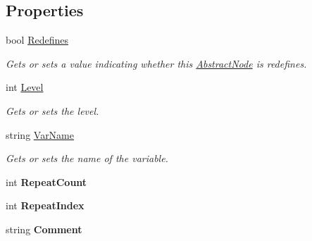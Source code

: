 \subsection*{Properties}
\begin{DoxyCompactItemize}
\item 
bool \hyperlink{class__1920_parser_1_1_abstract_node_a66fd8845fa232c78f396f15467e17458}{Redefines}
\begin{DoxyCompactList}\small\item\em Gets or sets a value indicating whether this \hyperlink{class__1920_parser_1_1_abstract_node}{Abstract\+Node} is redefines. \end{DoxyCompactList}\item 
int \hyperlink{class__1920_parser_1_1_abstract_node_a08c3c1dccbd57a5ddf4c6f2144223dc6}{Level}
\begin{DoxyCompactList}\small\item\em Gets or sets the level. \end{DoxyCompactList}\item 
string \hyperlink{class__1920_parser_1_1_abstract_node_ae4a8076d5cf940c9fa0b1a7fecdd4a6a}{Var\+Name}
\begin{DoxyCompactList}\small\item\em Gets or sets the name of the variable. \end{DoxyCompactList}\item 
int {\bfseries Repeat\+Count}\hypertarget{class__1920_parser_1_1_abstract_node_a68d196e888509c7a603ea9f89124cd11}{}\label{class__1920_parser_1_1_abstract_node_a68d196e888509c7a603ea9f89124cd11}

\item 
int {\bfseries Repeat\+Index}\hypertarget{class__1920_parser_1_1_abstract_node_a727fdfa1025e8c672a28c60bef03d9b9}{}\label{class__1920_parser_1_1_abstract_node_a727fdfa1025e8c672a28c60bef03d9b9}

\item 
string {\bfseries Comment}\hypertarget{class__1920_parser_1_1_abstract_node_aff4df7a21266685abdac7a455a0f7ac8}{}\label{class__1920_parser_1_1_abstract_node_aff4df7a21266685abdac7a455a0f7ac8}

\end{DoxyCompactItemize}


